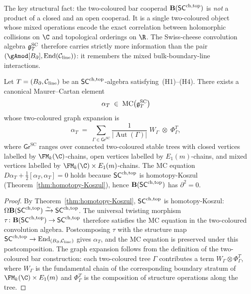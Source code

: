 The key structural fact: the two-coloured bar cooperad
$\mathbf{B}(\mathsf{SC}^{\mathrm{ch,top}})$ is \emph{not} a product of a closed and an
open cooperad. It is a single two-coloured object whose mixed
operations encode the exact correlation between holomorphic
collisions on $\C$ and topological orderings on $\R$. The
Swiss-cheese convolution algebra $\mathfrak{g}^{\mathrm{SC}}_T$ therefore carries
strictly more information than the pair $(\gAmod[\Bbound],
\End(\cC_{\mathrm{line}}))$: it remembers the mixed
bulk-boundary-line interactions.

\begin{theorem}
Let $T = (B_{\partial}, \mathcal C_{\mathrm{line}})$ be an $\mathsf{SC}^{\mathrm{ch,top}}$-algebra
satisfying~\textup{(H1)--(H4)}. There exists a canonical
Maurer--Cartan element
\begin{equation}%
\alpha_T
\;\in\;
\mc\bigl(\gSC_T\bigr)
\end{equation}
whose two-coloured graph expansion is
\[
\alpha_T
\;=\;
\sum_{\Gamma \in \mathsf{Gr}^{\mathrm{SC}}}
\frac{1}{|\operatorname{Aut}(\Gamma)|}
\;W_\Gamma\;\otimes\;\Phi_\Gamma^T,
\]
where $\mathsf{Gr}^{\mathrm{SC}}$ ranges over connected
two-coloured stable trees with closed vertices labelled by
$\FM_k(\C)$-chains, open vertices labelled by $E_1(m)$-chains,
and mixed vertices labelled by $\FM_k(\C) \times E_1(m)$-chains.
The MC equation
$D\alpha_T + \tfrac{1}{2}[\alpha_T, \alpha_T] = 0$
holds because $\mathsf{SC}^{\mathrm{ch,top}}$ is homotopy-Koszul
\textup{(}Theorem~\textup{\ref{thm:homotopy-Koszul}}\textup{)},
hence $\mathbf{B}(\mathsf{SC}^{\mathrm{ch,top}})$ has $\partial^2 = 0$.
\end{theorem}

\begin{proof}
By Theorem~\ref{thm:homotopy-Koszul}, $\mathsf{SC}^{\mathrm{ch,top}}$ is homotopy-Koszul:
$\Omega\mathbf{B}(\mathsf{SC}^{\mathrm{ch,top}}) \xrightarrow{\sim} \mathsf{SC}^{\mathrm{ch,top}}$. The universal
twisting morphism
$\tau\colon \mathbf{B}(\mathsf{SC}^{\mathrm{ch,top}}) \to \mathsf{SC}^{\mathrm{ch,top}}$ therefore satisfies the
MC equation in the two-coloured convolution algebra. Postcomposing
$\tau$ with the structure map $\mathsf{SC}^{\mathrm{ch,top}} \to \operatorname{End}_{(B_{\partial},
\mathcal C_{\mathrm{line}})}$ gives $\alpha_T$, and the MC equation is
preserved under this postcomposition. The graph expansion follows
from the definition of the two-coloured bar construction: each
two-coloured tree $\Gamma$ contributes a term $W_\Gamma \otimes
\Phi_\Gamma^T$, where $W_\Gamma$ is the fundamental chain of the
corresponding boundary stratum of $\FM_k(\C) \times E_1(m)$ and
$\Phi_\Gamma^T$ is the composition of structure operations along
the tree.
\end{proof}


